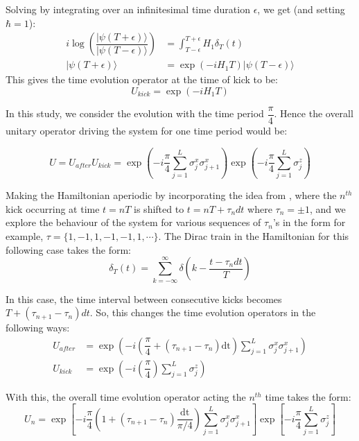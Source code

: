 \documentclass[11pt,a4paper]{article}
\begin{document}
Solving by integrating over an infinitesimal time duration $\epsilon$, we get (and setting $\hbar = 1$):
\begin{align}
i \log(\dfrac{|\psi(T+\epsilon)\rangle}{|\psi(T-\epsilon)\rangle}) &= \int_{T-\epsilon}^{T+\epsilon} H_{1}\delta_{T}(t)\\
|\psi(T+\epsilon)\rangle &= \exp(-iH_{1}T)|\psi(T-\epsilon)\rangle 
\end{align}
This gives the time evolution operator at the time of kick to be:
\begin{equation}
U_{kick} = \exp(-iH_{1}T)
\end{equation}
		 
		In this study, we consider the evolution with the time period $\dfrac{\pi}{4}$\cite{PhysRevA.91.022318}. Hence the overall unitary operator driving the system for one time period would be:
		 
		 \begin{equation}
		 U = U_{after}U_{kick} = \exp(-i\dfrac{\pi}{4}\sum_{j=1}^{L}\sigma_{j}^{x} \sigma_{j+1}^{x})  \exp(-i\dfrac{\pi}{4}\sum_{j=1}^{L}\sigma_{j}^{z})
		 \end{equation}
		 
		 Making the Hamiltonian aperiodic by incorporating the idea from \cite{PhysRevX.7.031034}, where the $n^{th}$ kick occurring at time $t= nT$ is shifted to $t = nT + \tau_{n}dt$ where $\tau_{n} = \pm 1$, and we explore the behaviour of the system for various sequences of $\tau_{n}$'s in the form for example, $\tau = \{1,-1,1,-1,-1,1,\cdots\}$. The Dirac train in the Hamiltonian for this following case takes the form:
		 \begin{equation}
		 \delta_{T}(t) =  \sum_{k=-\infty}^{\infty}\delta(k-\dfrac{t-\tau_{n}dt}{T})
		 \end{equation}

In this case, the time interval between consecutive kicks becomes $T + (\tau_{n+1}-\tau_{n})dt$. So, this changes the time evolution operators in the following ways:
\begin{align}
U_{after} &= \exp(-i
		 (\dfrac{\pi}{4}+(\tau_{n+1}-\tau_{n})\text{dt})\sum_{j=1}^{L}\sigma_{j}^{x} \sigma_{j+1}^{x})\\
		 U_{kick} &=  \exp(-i(\dfrac{\pi}{4})\sum_{j=1}^{L}\sigma_{j}^{z}) 
\end{align}

		With this, the overall time evolution operator acting the $n^{th}$ time takes the form:
		 \begin{equation}
		 U_{n} = \exp[-i
		 \dfrac{\pi}{4}(1+(\tau_{n+1}-\tau_{n})\dfrac{\text{dt}}{\pi/4})\sum_{j=1}^{L}\sigma_{j}^{x} \sigma_{j+1}^{x}]  \exp[-i\dfrac{\pi}{4}\sum_{j=1}^{L}\sigma_{j}^{z}]
		 \end{equation}
		 
\end{document}
